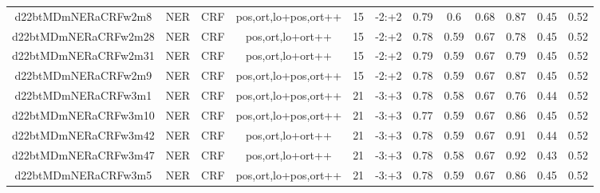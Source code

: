 \documentclass[a4paper]{article}
\begin{document}
\begin{landscape}
\begin{center}
\begin{tabular}{ |c|c|c|c|c|c|c|c|c|c|c|c|}
 
 	
 	\small{ d22btMDmNERaCRFw2m8 } & \small{ NER} & \small{  CRF }  & pos,ort,lo+pos,ort++  &  15 &  \small{  -2:+2 }  &  0.79 & 0.6 & 0.68  &  0.87 & 0.45 & 0.52 \\
 	

 
 	
 	\small{ d22btMDmNERaCRFw2m28 } & \small{ NER} & \small{  CRF }  & pos,ort,lo+ort++  &  15 &  \small{  -2:+2 }  &  0.78 & 0.59 & 0.67  &  0.78 & 0.45 & 0.52 \\
 	

 
 	
 	\small{ d22btMDmNERaCRFw2m31 } & \small{ NER} & \small{  CRF }  & pos,ort,lo+ort++  &  15 &  \small{  -2:+2 }  &  0.79 & 0.59 & 0.67  &  0.79 & 0.45 & 0.52 \\
 	

 
 	
 	\small{ d22btMDmNERaCRFw2m9 } & \small{ NER} & \small{  CRF }  & pos,ort,lo+pos,ort++  &  15 &  \small{  -2:+2 }  &  0.78 & 0.59 & 0.67  &  0.87 & 0.45 & 0.52 \\
 	

 
 	
 	\small{ d22btMDmNERaCRFw3m1 } & \small{ NER} & \small{  CRF }  & pos,ort,lo+pos,ort++  &  21 &  \small{  -3:+3 }  &  0.78 & 0.58 & 0.67  &  0.76 & 0.44 & 0.52 \\
 	

 
 	
 	\small{ d22btMDmNERaCRFw3m10 } & \small{ NER} & \small{  CRF }  & pos,ort,lo+pos,ort++  &  21 &  \small{  -3:+3 }  &  0.77 & 0.59 & 0.67  &  0.86 & 0.45 & 0.52 \\
 	

 
 	
 	\small{ d22btMDmNERaCRFw3m42 } & \small{ NER} & \small{  CRF }  & pos,ort,lo+ort++  &  21 &  \small{  -3:+3 }  &  0.78 & 0.59 & 0.67  &  0.91 & 0.44 & 0.52 \\
 	

 
 	
 	\small{ d22btMDmNERaCRFw3m47 } & \small{ NER} & \small{  CRF }  & pos,ort,lo+ort++  &  21 &  \small{  -3:+3 }  &  0.78 & 0.58 & 0.67  &  0.92 & 0.43 & 0.52 \\
 	

 
 	
 	\small{ d22btMDmNERaCRFw3m5 } & \small{ NER} & \small{  CRF }  & pos,ort,lo+pos,ort++  &  21 &  \small{  -3:+3 }  &  0.78 & 0.59 & 0.67  &  0.86 & 0.45 & 0.52 \\
 	


\end{tabular}
\end{center}
\end{landscape}
\end{document}
